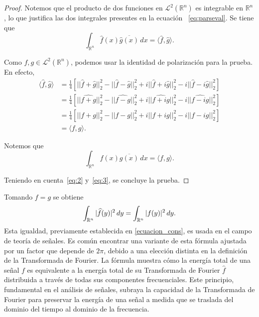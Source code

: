 \begin{proof}

Notemos que el producto de dos funciones en $\mathscr{L}^2(\mathbb{R}^n)$ es integrable en $\mathbb{R}^n$, lo que justifica las dos integrales presentes en la ecuación ~\eqref{eq:parseval}.
Se tiene que 
\begin{equation}\label{eq:3}
    \int_{\mathbb{R}^n} \widehat{f}(x) \overline{\widehat{g}(x)}\, dx  = \langle \widehat{f},\widehat{g} \rangle.
\end{equation}


\noindent Como $f,g \in \mathscr{L}^2(\mathbb{R}^n)$, podemos usar la identidad de polarización para la prueba.
En efecto, 
\begin{align}
    \langle \widehat{f},\widehat{g} \rangle &= \frac{1}{4} \left[ || \widehat{f}+\widehat{g}||_2^2 - || \widehat{f}-\widehat{g}||_2^2 + i|| \widehat{f}+i\widehat{g}||_2^2 - i|| \widehat{f}-i\widehat{g}||_2^2 \right] \\
    &= \frac{1}{4} \left[ || \widehat{f+g}||_2^2 - || \widehat{f-g}||_2^2 + i|| \widehat{f+ig}||_2^2 - i|| \widehat{f-ig}||_2^2 \right] \\
    &= \frac{1}{4} \left[ ||f+g||_2^2 - ||f-g||_2^2 + i|| f+ig||_2^2 - i|| f-ig||_2^2 \right] \\
    &= \langle f,g \rangle.
\end{align}

\noindent Notemos que
\begin{equation}\label{eq:2}
     \int_{\mathbb{R}^n} f(x) \overline{g(x)} \, dx = \langle f,g \rangle.
\end{equation}

\noindent   Teniendo en cuenta~\eqref{eq:2} y~\eqref{eq:3}, se concluye la prueba.
\end{proof}

\vspace{0.3cm}
\noindent Tomando $f=g$ se obtiene 
\begin{equation*}
    \int_{\mathbb{R}^n} |\widehat{f}(y)|^2   \, dy = \int_{\mathbb{R}^n} |f(y)|^2 \, dy. \qedhere
\end{equation*}
Esta igualdad, previamente establecida en \ref{ecuacion_cons}, es usada en el campo de teoría de señales.
Es común encontrar una variante de esta fórmula ajustada por un factor que depende de $2\pi$, debido a una elección distinta en la definición de la Transformada de Fourier. La fórmula muestra cómo la energía total de una señal $f$ es equivalente a la energía total de su Transformada de Fourier 
$\widehat{f}$ distribuida a través de todas sus componentes frecuenciales. Este principio, fundamental en el análisis de señales, subraya la capacidad de la Transformada de Fourier para preservar la energía de una señal a medida que se traslada del dominio del tiempo al dominio de la frecuencia. 

